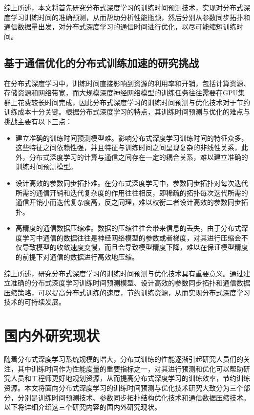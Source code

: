 综上所述，本文将首先研究分布式深度学习的训练时间预测技术，实现对分布式深度学习训练时间的准确预测，从而帮助分析性能瓶颈，然后分别从参数同步拓扑和通信数据量出发，对分布式深度学习的通信时间进行优化，以尽可能缩短训练时间。


\subsection{基于通信优化的分布式训练加速的研究挑战}

在分布式深度学习中，训练时间直接影响到资源的利用率和开销，包括计算资源、存储资源和网络带宽，而大规模深度神经网络模型的训练任务往往需要在GPU集群上花费较长时间完成，因此分布式深度学习的训练时间预测与优化技术对于节约训练成本十分关键。根据分布式深度学习的特点，其训练时间预测与优化的难点与挑战主要有以下三点：

\begin{itemize}
    \item [（1）] 建立准确的训练时间预测模型难。影响分布式深度学习训练时间的特征众多，这些特征之间依赖性强，并且特征与训练时间之间呈现复杂的非线性关系，此外，分布式深度学习的计算与通信之间存在一定的耦合关系，难以建立准确的训练时间预测模型。
    \item [（2）] 设计高效的参数同步拓扑难。在分布式深度学习中，参数同步拓扑对每次迭代所需的通信开销和迭代复杂度的作用往往相反，即稀疏的拓扑每次迭代所需的通信开销小而迭代复杂度高，反之同理，难以权衡二者设计高效的参数同步拓扑。
    \item [（3）] 高精度的通信数据压缩难。数据的压缩往往会带来信息的丢失，由于分布式深度学习中通信的数据往往是神经网络模型的参数或者梯度，对其进行压缩会不仅导致模型的收敛速度变慢，而且会导致模型精度下降，难以在保证模型精度的前提下对通信的数据进行高效地压缩。
\end{itemize}

综上所述，研究分布式深度学习的训练时间预测与优化技术具有重要意义。通过建立准确的分布式深度学习训练时间预测模型、设计高效的参数同步拓扑和通信数据压缩策略，可以提高分布式训练的速度，节约训练资源，从而实现分布式深度学习技术的可持续发展。%

\section{国内外研究现状}

随着分布式深度学习系统规模的增大，分布式训练的性能逐渐引起研究人员们的关注，其中训练时间作为性能度量的重要指标之一，对其进行预测和优化可以帮助研究人员和工程师更好地规划资源，从而提高分布式深度学习的训练效率，节约训练资源。本文将面向分布式深度学习的训练时间预测与优化技术研究大致分为三个部分，分别是训练时间预测技术、参数同步拓扑结构优化技术和通信数据压缩技术。以下将详细介绍这三个研究内容的国内外研究现状。

